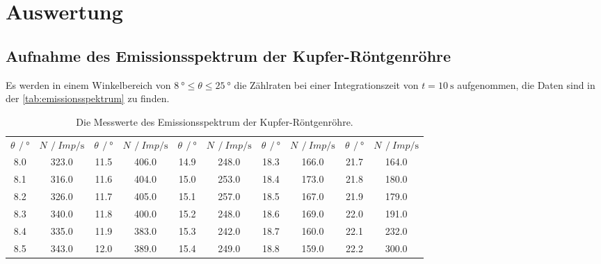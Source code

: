 \section{Auswertung}
\label{sec:Auswertung}

\subsection{Aufnahme des Emissionsspektrum der Kupfer-Röntgenröhre}

  Es werden in einem Winkelbereich von $ \SI{8}{\degree} \leq \theta \leq \SI{25}{\degree} $ die Zählraten bei einer Integrationszeit von $t=\SI{10}{\second}$ 
  aufgenommen, die Daten sind in der \autoref{tab:emissionsspektrum} zu finden. 

  \begin{table}
  \centering
  \caption{Die Messwerte des Emissionsspektrum der Kupfer-Röntgenröhre.}
  \label{tab:emissionsspektrum}
  \begin{tabular}{S[table-format=2.1] S[table-format=3.1] S[table-format=2.1] S[table-format=3.1] S[table-format=2.1] S[table-format=3.1] S[table-format=2.1] S[table-format=4.1] S[table-format=2.1] S[table-format=4.1]}
    \toprule
    $ \theta \, \mathbin{/} \si{\degree}$ & $ N \, \mathbin{/} \si{Imp\per\second}$ & 
    $ \theta \, \mathbin{/} \si{\degree}$ & $ N \, \mathbin{/} \si{Imp\per\second}$ &
    $ \theta \, \mathbin{/} \si{\degree}$ & $ N \, \mathbin{/} \si{Imp\per\second}$ &
    $ \theta \, \mathbin{/} \si{\degree}$ & $ N \, \mathbin{/} \si{Imp\per\second}$ &
    $ \theta \, \mathbin{/} \si{\degree}$ & $ N \, \mathbin{/} \si{Imp\per\second}$ \\
    \cmidrule(lr){1-2}\cmidrule(lr){3-4}\cmidrule(lr){5-6}\cmidrule(lr){7-8} \cmidrule(lr){9-10}
    8.0 	&	323.0 &    11.5	&	406.0 &    14.9	&	248.0 &     18.3	&	166.0  &      21.7	&	164.0 \\   
    8.1 	&	316.0 &    11.6	&	404.0 &    15.0	&	253.0 &     18.4	&	173.0  &      21.8	&	180.0 \\   
    8.2 	&	326.0 &    11.7	&	405.0 &    15.1	&	257.0 &     18.5	&	167.0  &      21.9	&	179.0 \\   
    8.3 	&	340.0 &    11.8	&	400.0 &    15.2	&	248.0 &     18.6	&	169.0  &      22.0	&	191.0 \\   
    8.4 	&	335.0 &    11.9	&	383.0 &    15.3	&	242.0 &     18.7	&	160.0  &      22.1	&	232.0 \\   
    8.5 	&	343.0 &    12.0	&	389.0 &    15.4	&	249.0 &     18.8	&	159.0  &      22.2	&	300.0 \\   

\end{tabular}
\end{table}
